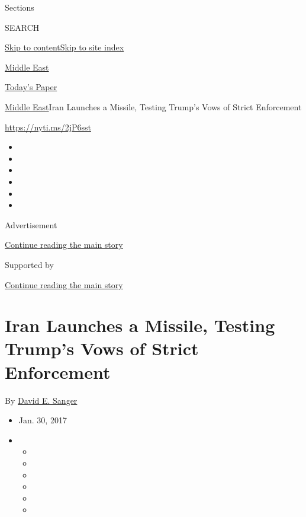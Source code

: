 Sections

SEARCH

\protect\hyperlink{site-content}{Skip to
content}\protect\hyperlink{site-index}{Skip to site index}

\href{https://www.nytimes3xbfgragh.onion/section/world/middleeast}{Middle
East}

\href{https://myaccount.nytimes3xbfgragh.onion/auth/login?response_type=cookie\&client_id=vi}{}

\href{https://www.nytimes3xbfgragh.onion/section/todayspaper}{Today's
Paper}

\href{/section/world/middleeast}{Middle East}\textbar{}Iran Launches a
Missile, Testing Trump's Vows of Strict Enforcement

\url{https://nyti.ms/2jP6sst}

\begin{itemize}
\item
\item
\item
\item
\item
\item
\end{itemize}

Advertisement

\protect\hyperlink{after-top}{Continue reading the main story}

Supported by

\protect\hyperlink{after-sponsor}{Continue reading the main story}

\hypertarget{iran-launches-a-missile-testing-trumps-vows-of-strict-enforcement}{%
\section{Iran Launches a Missile, Testing Trump's Vows of Strict
Enforcement}\label{iran-launches-a-missile-testing-trumps-vows-of-strict-enforcement}}

By \href{http://www.nytimes3xbfgragh.onion/by/david-e-sanger}{David E.
Sanger}

\begin{itemize}
\item
  Jan. 30, 2017
\item
  \begin{itemize}
  \item
  \item
  \item
  \item
  \item
  \item
  \end{itemize}
\end{itemize}

